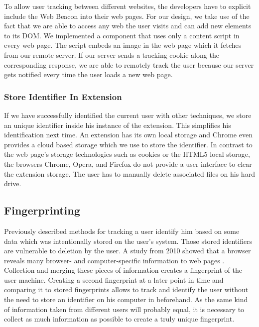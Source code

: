 	To allow user tracking between different websites, the developers have to explicit include the Web Beacon into their web pages. For our design, we take use of the fact that we are able to access any web the user visits and can add new elements to its DOM. We implemented a component that uses only a content script in every web page. The script embeds an image in the web page which it fetches from our remote server. If our server sends a tracking cookie along the corresponding response, we are able to remotely track the user because our server gets notified every time the user loads a new web page.  

\subsubsection{Store Identifier In Extension}
\label{sec:storeIdentifier}

	If we have successfully identified the current user with other techniques, we store an unique identifier inside his instance of the extension. This simplifies his identification next time. An extension has its own local storage and Chrome even provides a cloud based storage which we use to store the identifier. In contrast to the web page's storage technologies such as cookies or the HTML5 local storage, the browsers Chrome, Opera, and Firefox do not provide a user interface to clear the extension storage. The user has to manually delete associated files on his hard drive. 

\subsection{Fingerprinting}
\label{sec:fingerprinting}

	Previously described methods for tracking a user identify him based on some data which was intentionally stored on the user's system. Those stored identifiers are vulnerable to deletion by the user. A study from 2010 showed that a browser reveals many browser- and computer-specific information to web pages \cite{Eckersley:2010:UYW:1881151.1881152}. Collection and merging these pieces of information creates a fingerprint of the user machine. Creating a second fingerprint at a later point in time and comparing it to stored fingerprints allows to track and identify the user without the need to store an identifier on his computer in beforehand. As the same kind of information taken from different users will probably equal, it is necessary to collect as much information as possible to create a truly unique fingerprint. 
	
